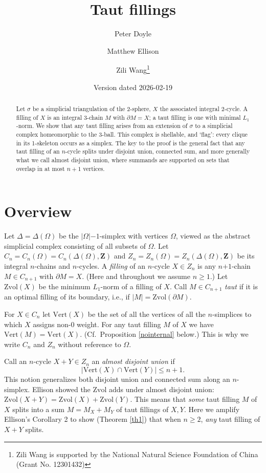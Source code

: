 \documentclass[12pt]{article}
\title{Taut fillings}
\author{Peter Doyle \and Matthew Ellison \and Zili Wang\thanks{
Zili Wang is supported by
the National Natural Science Foundation of China (Grant No. 12301432)
}}
\date{Version dated 2026-02-19
}
\def\ZZ{\mathbf{Z}}
\def\del{\partial}
\newcommand{\kw}{\mathrm}
\newcommand{\vertices}{\kw{Vert}}
\newcommand{\Zvol}{\kw{Zvol}}
\newcommand{\pls}{\mathord{+}}
\newcommand{\mns}{\mathord{-}}
\begin{document}
\maketitle

\begin{abstract}
Let $\sigma$ be a simplicial triangulation of the 2-sphere,
$X$ the associated integral 2-cycle.
A filling of $X$ is an integral 3-chain $M$
with $\del M = X$;
a taut filling is one with minimal $L_1$-norm.
We show that any taut filling 
arises from an extension of $\sigma$ to
a simplicial complex homeomorphic to the 3-ball.
This complex is shellable, and `flag':
every clique in its 1-skeleton occurs as a simplex.
The key to the proof is the general
fact that any taut filling of an $n$-cycle
splits under disjoint union, connected sum, and more generally
what we call almost disjoint union,
where summands are supported on sets that overlap in at most $n+1$ vertices.

\end{abstract}

\section{Overview}
Let $\Delta = \Delta(\Omega)$ be the $|\Omega|\mns 1$-simplex
with vertices $\Omega$,
viewed as the abstract simplicial complex consisting of all subsets of
$\Omega$.
Let $C_n=C_n(\Omega)=C_n(\Delta(\Omega),\ZZ)$
and $Z_n=Z_n(\Omega)=Z_n(\Delta(\Omega),\ZZ)$
be its integral $n$-chains and $n$-cycles.
A \emph{filling} of an $n$-cycle $X \in Z_n$ is any
$n\pls 1$-chain $M \in C_{n+1}$ with $\del M = X$.
(Here and throughout we assume $n\geq 1$.)
Let $\Zvol(X)$ be the minimum $L_1$-norm of a filling of $X$.
Call $M \in C_{n+1}$ \emph{taut} if it is an optimal filling
of its boundary, i.e., if $|M|=\Zvol(\del M)$.

For $X \in C_n$ let
$\vertices(X)$ be the set of all the vertices of all the $n$-simplices
to which $X$ assigns non-$0$ weight.
For any taut filling $M$ of $X$ we have $\vertices(M) = \vertices(X)$.
(Cf.\ Proposition \ref{nointernal} below.)
This is why we write $C_n$ and $Z_n$ without reference to $\Omega$.

Call an $n$-cycle $X+Y \in Z_n$ an \emph{almost disjoint union} if
\[
|\vertices(X) \cap \vertices(Y)| \leq n+1
.
\]
This notion generalizes both disjoint union and connected sum
along an $n$-simplex.
Ellison \cite{ellison:gap}
showed the $\Zvol$ adds under almost disjoint union:
$\Zvol(X+Y) = \Zvol(X) + \Zvol(Y)$.
This means that \emph{some} taut filling $M$ of $X$ splits into a sum
$M=M_X+M_Y$ of taut fillings of $X,Y$.
Here we amplify Ellison's Corollary 2 to show (Theorem \ref{th1})
that when $n \geq 2$, \emph{any} taut filling of $X+Y$ splits.
\end{document}
